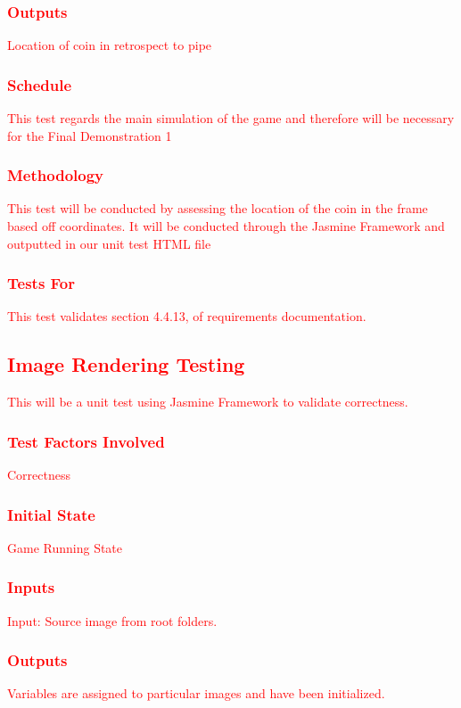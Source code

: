 \documentclass[11pt, oneside]{article}   	%
\begin{document}
\subsubsection{\textcolor{red}{Outputs}}
\textcolor{red}{Location of coin in retrospect to pipe}
\subsubsection{\textcolor{red}{Schedule}}
\textcolor{red}{This test regards the main simulation of the game and therefore will be necessary for the Final Demonstration 1}
\subsubsection{\textcolor{red}{Methodology}}
\textcolor{red}{This test will be conducted by assessing the location of the coin in the frame based off coordinates. It will be conducted through the Jasmine Framework and outputted in our unit test HTML file}
\subsubsection{\textcolor{red}{Tests For}}
\textcolor{red}{This test validates section 4.4.13, of requirements documentation.}


\subsection{\textcolor{red}{Image Rendering Testing}}
\textcolor{red}{This will be a unit test using Jasmine Framework to validate correctness.}
\subsubsection{\textcolor{red}{Test Factors Involved}}
\textcolor{red}{Correctness}
\subsubsection{\textcolor{red}{Initial State}}
\textcolor{red}{Game Running State}
\subsubsection{\textcolor{red}{Inputs}}
\textcolor{red}{Input: Source image from root folders.}
\subsubsection{\textcolor{red}{Outputs}}
\textcolor{red}{Variables are assigned to particular images and have been initialized.}
\end{document}
